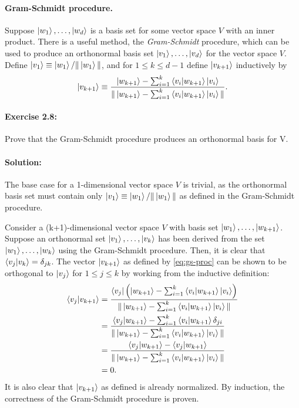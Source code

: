 \paragraph{Gram-Schmidt procedure.} Suppose $\ket{w_1}, \ldots, \ket{w_d}$ is a
basis set for some vector space $V$ with an inner product. There is a useful
method, the \emph{Gram-Schmidt} procedure, which can be used to produce an
orthonormal basis set $\ket{v_1}, \ldots, \ket{v_d}$ for the vector space $V$.
Define $\ket{v_1} \equiv \ket{w_1}/\|\ket{w_1}\|$, and for $1 \leq k \leq d -
1$ define $\ket{v_{k+1}}$ inductively by \begin{equation}
  \ket{v_{k+1}} \equiv \frac{\ket{w_{k+1}} - \sum_{i=1}^k \braket{v_i}{w_{k+1}}
    \ket{v_i}}{\|\ket{w_{k+1}} - \sum_{i=1}^k \braket{v_i}{w_{k+1}}
    \ket{v_i}\|}. \label{eq:gs-proc}
\end{equation}

\paragraph{\cite{mikeandike} Exercise 2.8:} Prove that the Gram-Schmidt
procedure produces an orthonormal basis for V.

\paragraph{Solution:} The base case for a 1-dimensional vector space $V$ is
trivial, as the orthonormal basis set must contain only $\ket{v_1} \equiv
\ket{w_1}/\|\ket{w_1}\|$ as defined in the Gram-Schmidt procedure.

Consider a (k+1)-dimensional vector space $V$ with basis set $\ket{w_1},
\ldots, \ket{w_{k+1}}$. Suppose an orthonormal set $\ket{v_1}, \ldots,
\ket{v_k}$ has been derived from the set $\ket{w_1}, \ldots, \ket{w_k}$ using
the Gram-Schmidt procedure. Then, it is clear that $\braket{v_j}{v_k} =
\delta_{jk}$. The vector $\ket{v_{k+1}}$ as defined by \eqref{eq:gs-proc} can
be shown to be orthogonal to $\ket{v_j}$ for $1 \leq j \leq k$ by working from
the inductive definition: \begin{align*}
  \braket{v_j}{v_{k+1}}
    &= \frac{\bra{v_j} \left(\ket{w_{k+1}} - \sum_{i=1}^k
      \braket{v_i}{w_{k+1}}\ket{v_i}\right)}{\|\ket{w_{k+1}} - \sum_{i=1}^k
      \braket{v_i}{w_{k+1}}\ket{v_i}\|} \\
    &= \frac{\braket{v_j}{w_{k+1}} - \sum_{i=1}^k \braket{v_i}{w_{k+1}}
      \delta_{ji}}{\|\ket{w_{k+1}} - \sum_{i=1}^k \braket{v_i}{w_{k+1}}
      \ket{v_i}\|} \\
    &= \frac{\braket{v_j}{w_{k+1}} - \braket{v_j}{w_{k+1}}}{\|\ket{w_{k+1}} -
      \sum_{i=1}^k \braket{v_i}{w_{k+1}}\ket{v_i}\|} \\
    &= 0.
\end{align*} It is also clear that $\ket{v_{k+1}}$ as defined is already
normalized. By induction, the correctness of the Gram-Schmidt procedure is
proven.

